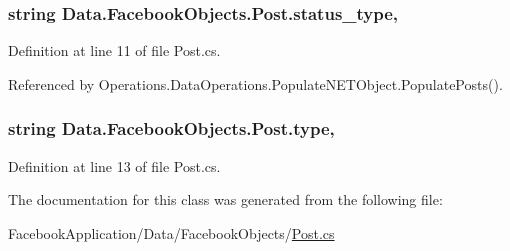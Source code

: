 \subsubsection[{\texorpdfstring{status\+\_\+type}{status_type}}]{\setlength{\rightskip}{0pt plus 5cm}string Data.\+Facebook\+Objects.\+Post.\+status\+\_\+type\hspace{0.3cm}{\ttfamily [get]}, {\ttfamily [set]}}\hypertarget{class_data_1_1_facebook_objects_1_1_post_a108de96063725263fdd8a0df92f110ab}{}\label{class_data_1_1_facebook_objects_1_1_post_a108de96063725263fdd8a0df92f110ab}


Definition at line 11 of file Post.\+cs.



Referenced by Operations.\+Data\+Operations.\+Populate\+N\+E\+T\+Object.\+Populate\+Posts().

\subsubsection[{\texorpdfstring{type}{type}}]{\setlength{\rightskip}{0pt plus 5cm}string Data.\+Facebook\+Objects.\+Post.\+type\hspace{0.3cm}{\ttfamily [get]}, {\ttfamily [set]}}\hypertarget{class_data_1_1_facebook_objects_1_1_post_aa2861fcd6537791f9d5f518af2675992}{}\label{class_data_1_1_facebook_objects_1_1_post_aa2861fcd6537791f9d5f518af2675992}


Definition at line 13 of file Post.\+cs.



The documentation for this class was generated from the following file\+:\begin{DoxyCompactItemize}
\item 
Facebook\+Application/\+Data/\+Facebook\+Objects/\hyperlink{_post_8cs}{Post.\+cs}\end{DoxyCompactItemize}
